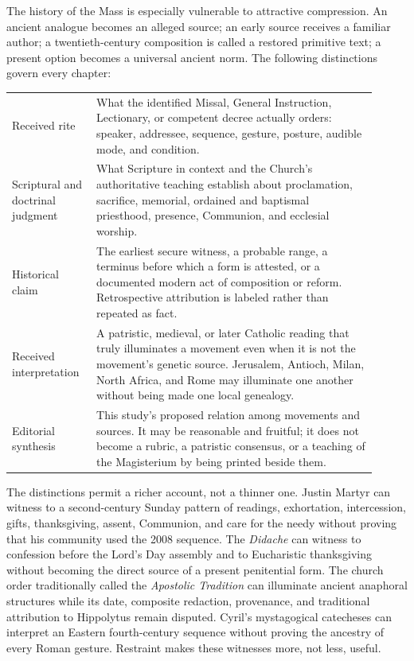 {The history of the Mass is especially vulnerable to attractive compression. An ancient analogue becomes an alleged source; an early source receives a familiar author; a twentieth-century composition is called a restored primitive text; a present option becomes a universal ancient norm. The following distinctions govern every chapter:

\begin{longtable}{>{\bfseries\raggedright\arraybackslash}p{0.20\linewidth}>{\raggedright\arraybackslash}p{0.71\linewidth}}
Received rite & What the identified Missal, General Instruction, Lectionary, or competent decree actually orders: speaker, addressee, sequence, gesture, posture, audible mode, and condition.\\
Scriptural and doctrinal judgment & What Scripture in context and the Church's authoritative teaching establish about proclamation, sacrifice, memorial, ordained and baptismal priesthood, presence, Communion, and ecclesial worship.\\
Historical claim & The earliest secure witness, a probable range, a terminus before which a form is attested, or a documented modern act of composition or reform. Retrospective attribution is labeled rather than repeated as fact.\\
Received interpretation & A patristic, medieval, or later Catholic reading that truly illuminates a movement even when it is not the movement's genetic source. Jerusalem, Antioch, Milan, North Africa, and Rome may illuminate one another without being made one local genealogy.\\
Editorial synthesis & This study's proposed relation among movements and sources. It may be reasonable and fruitful; it does not become a rubric, a patristic consensus, or a teaching of the Magisterium by being printed beside them.\\
\end{longtable}

The distinctions permit a richer account, not a thinner one. Justin Martyr can witness to a second-century Sunday pattern of readings, exhortation, intercession, gifts, thanksgiving, assent, Communion, and care for the needy without proving that his community used the 2008 sequence. The \emph{Didache} can witness to confession before the Lord's Day assembly and to Eucharistic thanksgiving without becoming the direct source of a present penitential form. The church order traditionally called the \emph{Apostolic Tradition} can illuminate ancient anaphoral structures while its date, composite redaction, provenance, and traditional attribution to Hippolytus remain disputed. Cyril's mystagogical catecheses can interpret an Eastern fourth-century sequence without proving the ancestry of every Roman gesture. Restraint makes these witnesses more, not less, useful.

}
